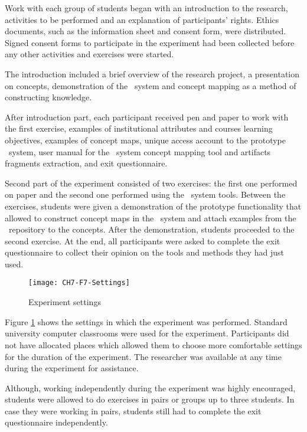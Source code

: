 Work with each group of students began with an introduction to the research,
activities to be performed and an explanation of participants' rights.
Ethics documents, such as the information sheet and consent form, were
distributed. Signed consent forms to participate in the experiment had been
collected before any other activities and exercises were started.

The introduction included a brief overview of the research project, a
presentation on \LLLs concepts, demonstration of the \ep~system and concept
mapping as a method of constructing knowledge.

After introduction part, each participant received pen and paper to work with
the first exercise, examples of institutional attributes and courses learning
objectives, examples of concept maps, unique access account to the prototype
\ep~system, user manual for the \ep~system concept mapping tool and artifacts
fragments extraction, and exit questionnaire.

Second part of the experiment consisted of two exercises: the first one
performed on paper and the second one performed using the \ep~system tools.
Between the exercises, students were given a demonstration of the prototype
functionality that allowed to construct concept maps in the \ep~system and
attach examples from the \ep~repository to the concepts. After the
demonstration, students proceeded to the second exercise. At the end, all
participants were asked to complete the exit questionnaire to collect their
opinion on the tools and methods they had just used.

\begin{figure}[htb]
\centering
\texttt{[image: CH7-F7-Settings]}
\caption{Experiment settings}
\label{fig:settings}
\end{figure}

Figure \ref{fig:settings} shows the settings in which the experiment was
performed. Standard university computer classrooms were used for the experiment.
Participants did not have allocated places which allowed them to choose more
comfortable settings for the duration of the experiment. The researcher was
available at any time during the experiment for assistance.

Although, working independently during the experiment was highly encouraged,
students were allowed to do exercises in pairs or groups up to three students.
In case they were working in pairs, students still had to complete the exit
questionnaire independently.

